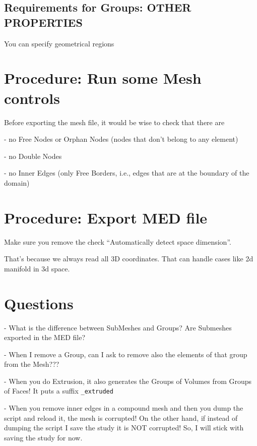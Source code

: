 \documentclass[10pt]{book}
\begin{document}
  
 \section{Requirements for Groups: OTHER PROPERTIES}
 
 You can specify geometrical regions
 
 
  
 \chapter{Procedure: Run some Mesh controls}
 
 Before exporting the mesh file, it would be wise to check that there are 
  
  - no Free Nodes or Orphan Nodes (nodes that don't belong to any element)
  
  - no Double Nodes
  
  - no Inner Edges (only Free Borders, i.e., edges that are at the boundary of the domain)
  
  
 \chapter{Procedure: Export MED file}
 
  Make sure you remove the check ``Automatically detect space dimension''.
  
  That's because we always read all 3D coordinates.
  That can handle cases like 2d manifold in 3d space.
  
  

 

 \chapter{Questions}

- What is the difference between SubMeshes and Groups? Are Submeshes exported in the MED file?

- When I remove a Group, can I ask to remove also the elements of that group from the Mesh???

- When you do Extrusion, it also generates the Groups of Volumes from Groups of Faces! It puts a suffix \verb|_extruded|

- When you remove inner edges in a compound mesh and then you dump the script and reload it, the mesh is corrupted! 
On the other hand, if instead of dumping the script I save the study it is NOT corrupted! So, I will stick with saving the study for now.
\end{document}
